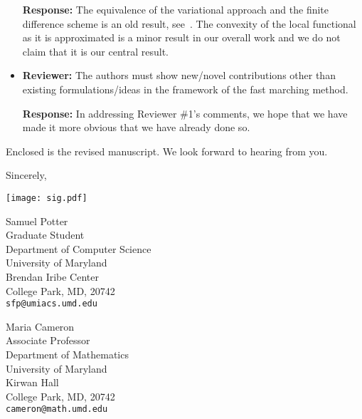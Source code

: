 \documentclass{article}
\begin{document}
\begin{itemize}
  \textbf{Response:} The equivalence of the variational approach and
  the finite difference scheme is an old result,
  see~\cite{sethian1999level}. The convexity of the local functional
  as it is approximated is a minor result in our overall work and we
  do not claim that it is our central result.

\item \textbf{Reviewer:} The authors must show new/novel contributions
  other than existing formulations/ideas in the framework of the fast
  marching method.

  \textbf{Response:} In addressing Reviewer \#1's comments, we hope
  that we have made it more obvious that we have already done so.

\end{itemize}

Enclosed is the revised manuscript. We look forward to hearing from you.

Sincerely,

\begin{minipage}{.5\linewidth}
  \texttt{[image: sig.pdf]}
\end{minipage}%
\begin{minipage}{.5\linewidth}
\end{minipage}


\begin{minipage}[t]{.5\linewidth}
  Samuel Potter \\
  Graduate Student \\
  Department of Computer Science \\
  University of Maryland \\
  Brendan Iribe Center \\
  College Park, MD, 20742 \\
  \texttt{sfp@umiacs.umd.edu}
\end{minipage}%
\begin{minipage}[t]{.5\linewidth}
  Maria Cameron \\
  Associate Professor \\
  Department of Mathematics \\
  University of Maryland \\
  Kirwan Hall \\
  College Park, MD, 20742 \\
  \texttt{cameron@math.umd.edu}
\end{minipage}


{}
\end{document}
